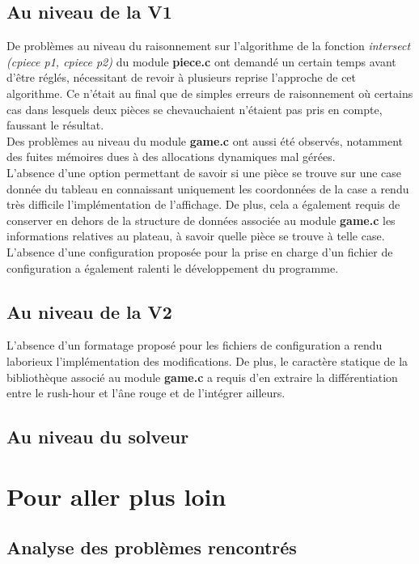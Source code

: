 \documentclass{report}
\begin{document}
\section{Au niveau de la V1}
De problèmes au niveau du raisonnement sur l'algorithme de la fonction \textit{intersect (cpiece p1, cpiece p2)} du module \textbf{piece.c} ont demandé un certain temps avant d'être réglés, nécessitant de revoir à plusieurs reprise l'approche de cet algorithme. Ce n'était au final que de simples erreurs de raisonnement où certains cas dans lesquels deux pièces se chevauchaient n'étaient pas pris en compte, faussant le résultat.\\
Des problèmes au niveau du module \textbf{game.c} ont aussi été observés, notamment des fuites mémoires dues à des allocations dynamiques mal gérées.\\
L'absence d'une option permettant de savoir si une pièce se trouve sur une case donnée du tableau en connaissant uniquement les coordonnées de la case a rendu très difficile l'implémentation de l'affichage.
De plus, cela a également requis de conserver en dehors de la structure de données associée au module \textbf{game.c} les informations relatives au plateau, à savoir quelle pièce se trouve à telle case.\\
L'absence d'une configuration proposée pour la prise en charge d'un fichier de configuration a également ralenti le développement du programme.

\section{Au niveau de la V2}
L'absence d'un formatage proposé pour les fichiers de configuration a rendu laborieux l'implémentation des modifications.
De plus, le caractère statique de la bibliothèque associé au module \textbf{game.c} a requis d'en extraire la différentiation entre le rush-hour et l'âne rouge et de l'intégrer ailleurs.

\section{Au niveau du solveur}



\chapter{Pour aller plus loin}
\setcounter{section}{0}
\section{Analyse des problèmes rencontrés}
\end{document}
